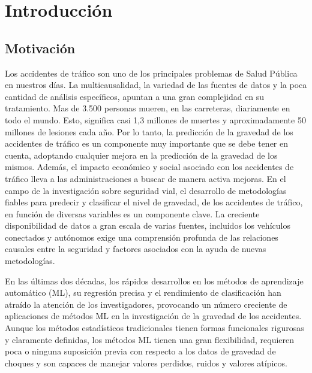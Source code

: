 
\chapter{Introducción}

\section {Motivación}


	Los accidentes de tráﬁco son uno de los principales problemas de Salud Pública en nuestros días. La multicausalidad, la variedad de las fuentes de datos y la poca cantidad de análisis especíﬁcos, apuntan a una gran complejidad en su tratamiento. Mas de 3.500 personas mueren, en las carreteras, diariamente en todo el mundo. Esto, signiﬁca casi 1,3 millones de muertes y aproximadamente 50 millones de lesiones cada año. Por lo tanto, la predicción de la gravedad de los accidentes de tráﬁco es un componente muy importante que se debe tener en cuenta, adoptando cualquier mejora en la predicción de la gravedad de los mismos. Además, el impacto económico y social asociado con los accidentes de tráﬁco lleva a las administraciones a buscar de manera activa mejoras.
	En el campo de la investigación sobre seguridad vial, el desarrollo de metodologías ﬁables para predecir y clasiﬁcar el nivel de gravedad, de los accidentes de tráﬁco, en función de diversas variables es un componente clave. La creciente disponibilidad de datos a gran escala de varias fuentes, incluidos los vehículos conectados y autónomos exige una comprensión profunda de las relaciones causales entre la seguridad y factores asociados con la ayuda de nuevas metodologías.

	En las últimas dos décadas, los rápidos desarrollos en los métodos de aprendizaje automático (ML), su regresión precisa y el rendimiento de clasiﬁcación han atraído la atención de los investigadores, provocando un número creciente de aplicaciones de métodos ML en la investigación de la gravedad de los accidentes. Aunque los métodos estadísticos tradicionales tienen formas funcionales rigurosas y claramente deﬁnidas, los métodos ML tienen una gran ﬂexibilidad, requieren poca o ninguna suposición previa con respecto a los datos de gravedad de choques y son capaces de manejar valores perdidos, ruidos y valores atípicos.

